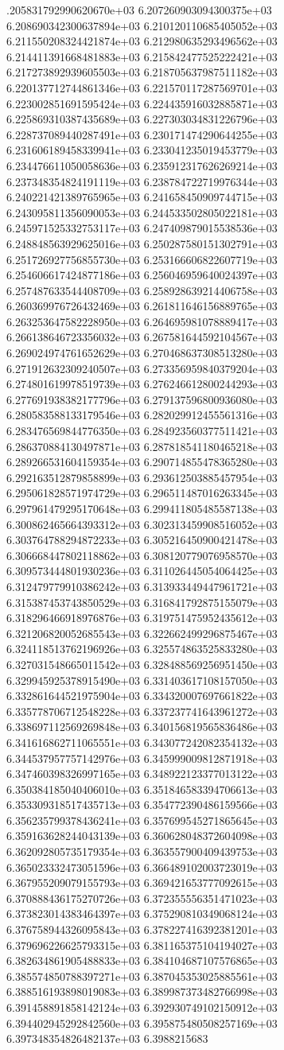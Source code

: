 .205831792990620670e+03	6.207260903094300375e+03	6.208690342300637894e+03	6.210120110685405052e+03	6.211550208324421874e+03	6.212980635293496562e+03	6.214411391668481883e+03	6.215842477525222421e+03	6.217273892939605503e+03	6.218705637987511182e+03	6.220137712744861346e+03	6.221570117287569701e+03	6.223002851691595424e+03	6.224435916032885871e+03	6.225869310387435689e+03	6.227303034831226796e+03	6.228737089440287491e+03	6.230171474290644255e+03	6.231606189458339941e+03	6.233041235019453779e+03	6.234476611050058636e+03	6.235912317626269214e+03	6.237348354824191119e+03	6.238784722719976344e+03	6.240221421389765965e+03	6.241658450909744715e+03	6.243095811356090053e+03	6.244533502805022181e+03	6.245971525332753117e+03	6.247409879015538536e+03	6.248848563929625016e+03	6.250287580151302791e+03	6.251726927756855730e+03	6.253166606822607719e+03	6.254606617424877186e+03	6.256046959640024397e+03	6.257487633544408709e+03	6.258928639214406758e+03	6.260369976726432469e+03	6.261811646156889765e+03	6.263253647582228950e+03	6.264695981078889417e+03	6.266138646723356032e+03	6.267581644592104567e+03	6.269024974761652629e+03	6.270468637308513280e+03	6.271912632309240507e+03	6.273356959840379204e+03	6.274801619978519739e+03	6.276246612800244293e+03	6.277691938382177796e+03	6.279137596800936080e+03	6.280583588133179546e+03	6.282029912455561316e+03	6.283476569844776350e+03	6.284923560377511421e+03	6.286370884130497871e+03	6.287818541180465218e+03	6.289266531604159354e+03	6.290714855478365280e+03	6.292163512879858899e+03	6.293612503885457954e+03	6.295061828571974729e+03	6.296511487016263345e+03	6.297961479295170648e+03	6.299411805485587138e+03	6.300862465664393312e+03	6.302313459908516052e+03	6.303764788294872233e+03	6.305216450900421478e+03	6.306668447802118862e+03	6.308120779076958570e+03	6.309573444801930236e+03	6.311026445054064425e+03	6.312479779910386242e+03	6.313933449447961721e+03	6.315387453743850529e+03	6.316841792875155079e+03	6.318296466918976876e+03	6.319751475952435612e+03	6.321206820052685543e+03	6.322662499296875467e+03	6.324118513762196926e+03	6.325574863525833280e+03	6.327031548665011542e+03	6.328488569256951450e+03	6.329945925378915490e+03	6.331403617108157050e+03	6.332861644521975904e+03	6.334320007697661822e+03	6.335778706712548228e+03	6.337237741643961272e+03	6.338697112569269848e+03	6.340156819565836486e+03	6.341616862711065551e+03	6.343077242082354132e+03	6.344537957757142976e+03	6.345999009812871918e+03	6.347460398326997165e+03	6.348922123377013122e+03	6.350384185040406010e+03	6.351846583394706613e+03	6.353309318517435713e+03	6.354772390486159566e+03	6.356235799378436241e+03	6.357699545271865645e+03	6.359163628244043139e+03	6.360628048372604098e+03	6.362092805735179354e+03	6.363557900409439753e+03	6.365023332473051596e+03	6.366489102003723019e+03	6.367955209079155793e+03	6.369421653777092615e+03	6.370888436175270726e+03	6.372355556351471023e+03	6.373823014383464397e+03	6.375290810349068124e+03	6.376758944326095843e+03	6.378227416392381201e+03	6.379696226625793315e+03	6.381165375104194027e+03	6.382634861905488833e+03	6.384104687107576865e+03	6.385574850788397271e+03	6.387045353025885561e+03	6.388516193898019083e+03	6.389987373482766998e+03	6.391458891858142124e+03	6.392930749102150912e+03	6.394402945292842560e+03	6.395875480508257169e+03	6.397348354826482137e+03	6.3988215683